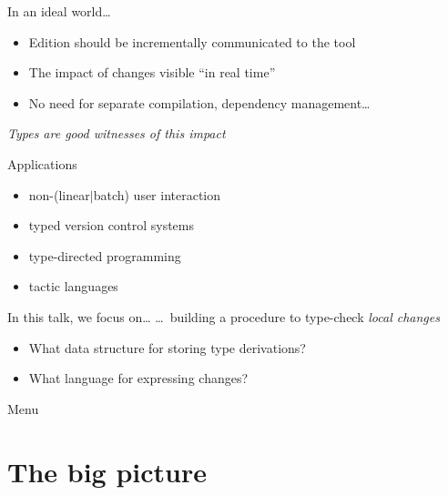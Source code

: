 \documentclass[ignorenonframetext,red]{beamer}
\begin{document}
\begin{frame}{In an ideal world\ldots}
  \begin{itemize}
  \item Edition should be incrementally communicated to the tool
  \item The impact of changes visible “in real time”
  \item No need for separate compilation, dependency management\ldots
  \end{itemize}
  \pause
  \vspace{2em}
  \begin{center}
    {\large \it Types are good witnesses of this impact}
  \end{center}
  \vspace{1em}
  \pause
  \begin{block}{Applications}
    \vspace{-0.5em}
    \footnotesize
    \begin{itemize}
    \item non-(linear$|$batch) user interaction
    \item typed version control systems
    \item type-directed programming
    \item tactic languages
    \end{itemize}
  \end{block}
\end{frame}

\begin{frame}{In this talk, we focus on\ldots}
  \ldots\ building a procedure to type-check \emph{local changes}

  \begin{itemize}
  \item What data structure for storing type derivations?
  \item What language for expressing changes?
  \end{itemize}
\end{frame}

\begin{frame}{Menu}
  \tableofcontents
\end{frame}

\section{The big picture}
\end{document}
